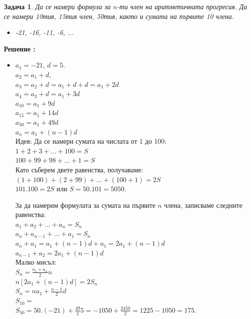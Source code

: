 \documentclass{article}
\newtheorem{problem}{Задача}
\newcounter{solution}
\newcommand\solution{%
	\stepcounter{solution}%
	\textbf{Решение :}\\%
}
\begin{document}
\begin{problem}
	Да се намери формула за $n$-ти член на аритметичната прогресия. Да се намери 10тия, 15тия член, 50тия, както и сумата на първите 10 члена.
	\begin{itemize}
		\item -21, -16, -11, -6, ...
		
	\end{itemize}
\end{problem}

\solution
	\begin{itemize}
	\item  $a_1 = -21 $, $d = 5 $. \\
	$a_2 = a_1 +d $,\\ 
	$a_3 = a_2 + d = a_1 + d + d = a_1 + 2d $ \\
	$a_4 = a_3 + d = a_1 + 3d $ \\
	$a_{10} = a_1 + 9d  $ \\
	$a_{15} = a_1 + 14d $ \\
	$a_{50} = a_1 + 49d $ \\
	$a_n = a_1 +(n-1)d $ \\
	
	
	Идея: Да се намери сумата на числата от 1 до 100: \\
	$1 + 2 + 3 + ... + 100 = S $ \\
	$100 + 99 + 98 + ... + 1 = S $ \\
	Като съберем двете равенства, получаваме: \\
	$(1+100) + (2+99) + ... + (100+1) = 2S $ \\
	$101.100 = 2S $ или $S = 50.101 = 5050 $.
	
	
	За да намерим формулата за сумата на първите $n$ члена, записваме следните равенства: \\
	$a_1 + a_2 + ... + a_n = S_n  $ \\
	$a_n + a_{n-1} + ... + a_1 = S_n $ \\
	
	
	$a_n + a_1 = a_1 + (n-1)d + a_1 = 2a_1 + (n-1)d $ \\
	$a_{n-1} + a_2  = 2a_1 + (n-1)d $ \\
	Малко мисъл:\\
	$S_n = \frac{a_1 + a_n}{2}n $ \\
	$n[2a_1 + (n-1)d] = 2S_n $ \\
	$ S_n = na_1 + \frac{n-1}{2}d $ \\
	
	
	$S_{10} =   $ \\
	 $S_{50} = 50.(-21) + \frac{49}{2}5 = -1050 +  \frac{2450}{2} = 1225 - 1050 = 175. $
	
\end{itemize}
\end{document}

